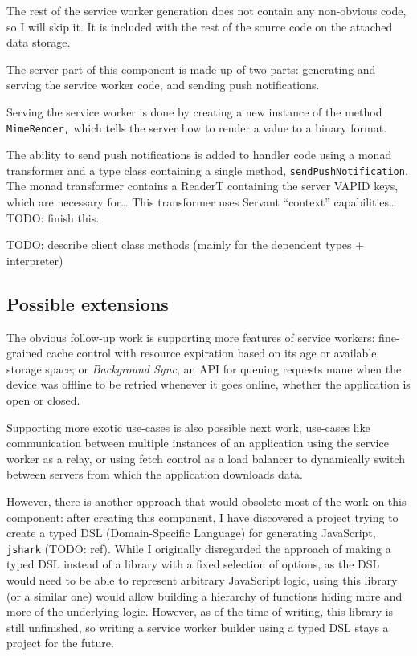 \documentclass[english,odsaz]{fitthesis}
\begin{document}
The rest of the service worker generation does not contain any non-obvious code,
so I will skip it. It is included with the rest of the source code on the
attached data storage.

The server part of this component is made up of two parts: generating and
serving the service worker code, and sending push notifications.

Serving the service worker is done by creating a new instance of the method
\texttt{MimeRender,} which tells the server how to render a value to a binary format.

The ability to send push notifications is added to handler code using a monad
transformer and a type class containing a single method, \texttt{sendPushNotification}.
The monad transformer contains a ReaderT containing the server VAPID keys, which
are necessary for\ldots{} This transformer uses Servant ``context''
capabilities\ldots{} TODO: finish this.

TODO: describe client class methods (mainly for the dependent types + interpreter)

\subsection{Possible extensions}
\label{sec:org98a9962}
The obvious follow-up work is supporting more features of service workers:
fine-grained cache control with resource expiration based on its age or available
storage space; or \emph{Background Sync}, an API for queuing requests mane when the device
was offline to be retried whenever it goes online, whether the application is
open or closed.

Supporting more exotic use-cases is also possible next work, use-cases like
communication between multiple instances of an application using the service
worker as a relay, or using fetch control as a load balancer to dynamically
switch between servers from which the application downloads data.

However, there is another approach that would obsolete most of the work on this
component: after creating this component, I have discovered a project trying to
create a typed DSL (Domain-Specific Language) for generating JavaScript, \texttt{jshark}
(TODO: ref). While I originally disregarded the approach of making a typed DSL
instead of a library with a fixed selection of options, as the DSL would need to
be able to represent arbitrary JavaScript logic, using this library (or a
similar one) would allow building a hierarchy of functions hiding more and more
of the underlying logic. However, as of the time of writing, this library is
still unfinished, so writing a service worker builder using a typed DSL stays a
project for the future.
\end{document}
